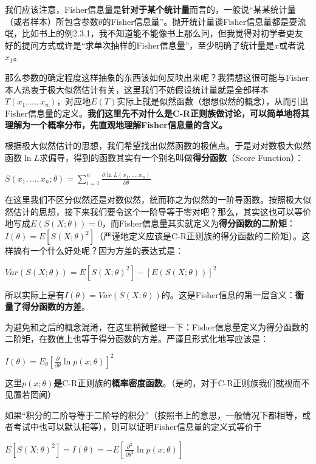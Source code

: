 \documentclass[10pt, a4paper]{article}
\begin{document}
我们应该注意，Fisher信息量是\textbf{针对于某个统计量}而言的，一般说“某某统计量（或者样本）所包含参数$\theta$的Fisher信息量”。抛开统计量谈Fisher信息量都是耍流氓，比如书上的例2.3.1，我不知道能不能像书上那么问，但我觉得对初学者更友好的提问方式或许是“求单次抽样的Fisher信息量”，至少明确了统计量是$x$或者说$x_1$。\par
那么参数的确定程度这样抽象的东西该如何反映出来呢？我猜想这很可能与Fisher本人热衷于极大似然估计有关，这里我们不妨假设统计量就是全部样本$T(x_1, \dots, x_n)$，对应地$E(T)$实际上就是似然函数（想想似然的概念），从而引出Fisher信息量的定义。\textbf{我们这里先不对什么是C-R正则族做讨论，可以简单地将其理解为一个概率分布，先直观地理解Fisher信息量的含义。}\\\par
根据极大似然估计的思想，我们希望找出似然函数的极值点。于是对对数极大似然函数$\ln L$求偏导，得到的函数其实有一个别名叫做\textbf{得分函数}（Score Function）：
\begin{center}
    $S(x_1,\dots,x_n;\theta)=\sum_{i=1}^{n}\frac{\partial \ln L(x_1,\dots,x_n)}{\partial \theta}$ 
\end{center}\par
在这里我们不区分似然还是对数似然，统而称之为似然的一阶导函数。按照极大似然估计的思想，接下来我们要令这个一阶导等于零对吧？那么，其实这也可以等价地写成$E(S(X;\theta))=0$，而Fisher信息量其实就定义为\textbf{得分函数的二阶矩}：$I(\theta)=E[S(X;\theta)^2]$（严谨地定义应该是C-R正则族的得分函数的二阶矩）。这样搞有一个什么好处呢？因为方差的表达式是：
\begin{center}
    $Var(S(X;\theta))= E[S(X;\theta)^2]-[E(S(X;\theta))]^2$ 
\end{center} \par
所以实际上是有$I(\theta)=Var(S(X;\theta))$的。这是Fisher信息的第一层含义：\textbf{衡量了得分函数的方差}。\par
为避免和之后的概念混淆，在这里稍微整理一下：Fisher信息量定义为得分函数的二阶矩，在数值上也等于得分函数的方差。严谨且形式化地写应该是：
\begin{center}
    $I(\theta)=E_{\theta}\left[\frac{\partial}{\partial \theta} \ln p(x ; \theta)\right]^{2}$ 
\end{center}
这里$p(x ; \theta)$\textbf{是}C-R正则族的\textbf{概率密度函数}。（是的，对于C-R正则族我们就视而不见置若罔闻）\par

如果“积分的二阶导等于二阶导的积分”（按照书上的意思，一般情况下都相等，或者考试中也可以默认相等），则可以证明Fisher信息量的定义式等价于
\begin{center}
    $E[S(X;\theta)^2]=I(\theta)=-E[\frac{\partial^2}{\partial \theta^2} \ln p(x;\theta)]$
\end{center}
\end{document}

